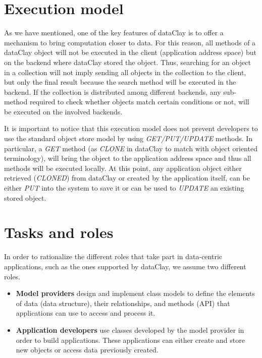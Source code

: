 \section{Execution model}
\label{sec:ExecutionModel}

As we have mentioned, one of the key features of dataClay is to offer a mechanism to bring computation closer to data. For this reason, all methods of a dataClay object will not be executed in the client (application address space) but on the backend where dataClay stored the object. Thus, searching for an object in a collection will not imply sending all objects in the collection to the client, but only the final result because the search method will be executed in the backend. If the collection is distributed among different backends, any sub-method required to check whether objects match certain conditions or not, will be executed on the involved backends.

It is important to notice that this execution model does not prevent developers to use the standard object store model by using \textit{GET/PUT/UPDATE} methods. In particular, a \textit{GET} method (as \textit{CLONE} in dataClay to match with object oriented terminology), will bring the object to the application address space and thus all methods will be executed locally. At this point, any application object either retrieved (\textit{CLONED}) from dataClay or created by the application itself, can be either \textit{PUT} into the system to save it or can be used to \textit{UPDATE} an existing stored object.

\section{Tasks and roles}

In order to rationalize the different roles that take part in data-centric applications, such as the ones supported by dataClay, we assume two different roles.

\begin{itemize}

\item {\bf Model providers} design and implement class models to define the elements of data (data structure), their relationships, and methods (API) that applications can use to access and process it.

\item {\bf Application developers} use classes developed by the model provider in order to build applications. These applications can either create and store new objects or access data previously created.

\end{itemize}

